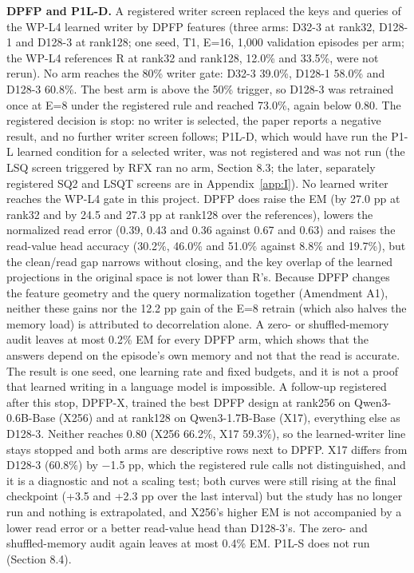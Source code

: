 \textbf{DPFP and P1L-D.} A registered writer screen replaced the keys and queries of the WP-L4 learned writer by DPFP features (three
arms: D32-3 at rank32, D128-1 and D128-3 at rank128; one seed, T1, E=16, 1,000 validation episodes per arm; the WP-L4 references R at
rank32 and rank128, 12.0\% and 33.5\%, were not rerun). No arm reaches the 80\% writer gate: D32-3 39.0\%, D128-1 58.0\% and  %
D128-3 60.8\%. The best arm is above the 50\% trigger, so D128-3 was retrained once at E=8 under the registered rule and  %
reached 73.0\%, again below 0.80. The registered decision is stop: no writer is selected, the paper reports a negative result,  %
and no further writer screen follows; P1L-D, which would have run the P1-L learned condition for a selected writer, was not registered and
was not run (the LSQ screen triggered by RFX ran no arm, Section 8.3; the later, separately registered SQ2 and LSQT screens are in Appendix~\ref{app:I}). No learned writer reaches the WP-L4 gate in this  %
project. DPFP does raise the EM (by 27.0 pp at rank32 and by 24.5 and 27.3 pp at rank128 over the references), lowers the normalized read
error (0.39, 0.43 and 0.36 against 0.67 and 0.63) and raises the read-value head accuracy (30.2\%, 46.0\% and 51.0\% against 8.8\% and 19.7\%),
but the clean/\allowbreak{}read gap narrows without closing, and the key overlap of the learned projections in the original space is not lower than R’s.
 Because DPFP changes the feature geometry and the query normalization together (Amendment A1), neither these gains nor the  %
12.2 pp gain of the E=8 retrain (which also halves the memory load) is attributed to decorrelation alone. A zero-  %
or shuffled-memory audit leaves at most 0.2\% EM for every DPFP arm, which shows that the answers depend on the episode’s own memory and not
that the read is accurate. The result is one seed, one learning rate and fixed budgets, and it is not a proof that learned  %
writing in a language model is impossible. A follow-up registered after this stop, DPFP-X, trained the best DPFP design at  %
rank256 on Qwen3-0.6B-Base (X256) and at rank128 on Qwen3-1.7B-Base (X17), everything else as D128-3. Neither reaches 0.80 (X256 66.2\%,
X17 59.3\%), so the learned-writer line stays stopped and both arms are descriptive rows next to DPFP. X17 differs from D128-3  %
(60.8\%) by \ensuremath{-}1.5 pp, which the registered rule calls not distinguished, and it is a diagnostic and not a scaling test; both curves were still
rising at the final checkpoint (+3.5 and +2.3 pp over the last interval) but the study has no longer run and nothing is extrapolated, and
X256’s higher EM is not accompanied by a lower read error or a better read-value head than D128-3’s. The  %
zero- and shuffled-memory audit again leaves at most 0.4\% EM. P1L-S does not run (Section 8.4).  %

